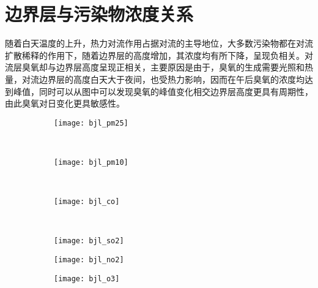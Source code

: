 \section{边界层与污染物浓度关系}

随着白天温度的上升，热力对流作用占据对流的主导地位，大多数污染物都在对流扩散稀释的作用下，随着边界层的高度增加，其浓度均有所下降，呈现负相关。对流层臭氧却与边界层高度呈现正相关，主要原因是由于，臭氧的生成需要光照和热量，对流边界层的高度白天大于夜间，也受热力影响，因而在午后臭氧的浓度均达到峰值，同时可以从图中可以发现臭氧的峰值变化相交边界层高度更具有周期性，由此臭氧对日变化更具敏感性。

\begin{figure}[!htbp]
    \centering
    \begin{subfigure}[b]{0.35\textwidth}
      \texttt{[image: bjl\_pm25]}
      \caption{}
      \label{fig:bjl_pm25}
    \end{subfigure}%
    ~%
    \begin{subfigure}[b]{0.35\textwidth}
      \texttt{[image: bjl\_pm10]}
      \caption{}
			\label{fig:bjl_pm10}
    \end{subfigure}
    \\%
    \begin{subfigure}[b]{0.35\textwidth}
      \texttt{[image: bjl\_co]}
      \caption{}
			\label{fig:bjl_co}
    \end{subfigure}%
    ~%
    \begin{subfigure}[b]{0.35\textwidth}
      \texttt{[image: bjl\_so2]}
      \caption{}
			\label{fig:bjl_so2}
    \end{subfigure}
    \begin{subfigure}[b]{0.35\textwidth}
      \texttt{[image: bjl\_no2]}
      \caption{}
			\label{fig:bjl_no2}
    \end{subfigure}
    \begin{subfigure}[b]{0.35\textwidth}
      \texttt{[image: bjl\_o3]}
      \caption{}
			\label{fig:bjl_o3}
    \end{subfigure}
    \label{fig:oaspl}
\end{figure}

